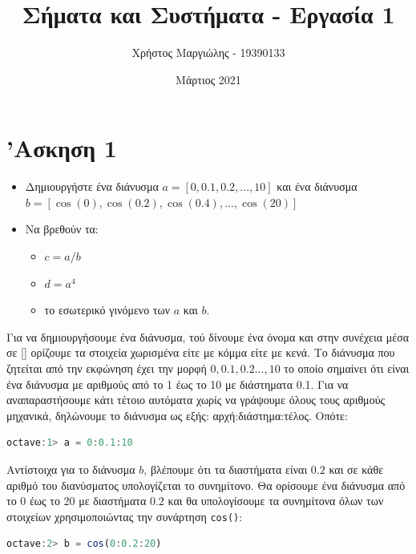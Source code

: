 \documentclass{article}
\title{Σήματα και Συστήματα - Εργασία 1}
\author{Χρήστος Μαργιώλης - 19390133}
\date{Μάρτιος 2021}
\begin{document}
\begin{titlepage}
        \maketitle
\end{titlepage}

\renewcommand{\contentsname}{Περιεχόμενα}
\tableofcontents

\section{'Ασκηση 1}

\begin{itemize}
        \item Δημιουργήστε ένα διάνυσμα $a = [0,0.1,0.2,...,10]$ και ένα διάνυσμα
                $b = [\cos(0),\cos(0.2),\cos(0.4),...,\cos(20)]$
        \item Να βρεθούν τα:
        \begin{itemize}
                \item $c = a / b$
                \item $d = a^4$
                \item το εσωτερικό γινόμενο των $a$ και $b$.
        \end{itemize}
\end{itemize}

Για να δημιουργήσουμε ένα διάνυσμα, τού δίνουμε ένα όνομα και στην συνέχεια μέσα
σε [] ορίζουμε τα στοιχεία χωρισμένα είτε με κόμμα είτε με κενά. Το διάνυσμα
που ζητείται από την εκφώνηση έχει την μορφή $0,0.1,0.2...,10$ το οποίο σημαίνει
ότι είναι ένα διάνυσμα με αριθμούς από το 1 έως το 10 με διάστηματα 0.1. Για να
αναπαραστήσουμε κάτι τέτοιο αυτόματα χωρίς να γράψουμε όλους τους αριθμούς μηχανικά,
δηλώνουμε το διάνυσμα ως εξής: αρχή:διάστημα:τέλος. Οπότε:

\begin{lstlisting}[language=octave]
        octave:1> a = 0:0.1:10
\end{lstlisting}

Αντίστοιχα για το διάνυσμα $b$, βλέπουμε ότι τα διαστήματα είναι $0.2$
και σε κάθε αριθμό του διανύσματος υπολογίζεται το συνημίτονο. Θα ορίσουμε
ένα διάνυσμα από το 0 έως το 20 με διαστήματα $0.2$ και θα υπολογίσουμε
τα συνημίτονα όλων των στοιχείων χρησιμοποιώντας την συνάρτηση \lstinline{cos()}:

\begin{lstlisting}[language=octave]
        octave:2> b = cos(0:0.2:20)
\end{lstlisting}
\end{document}
